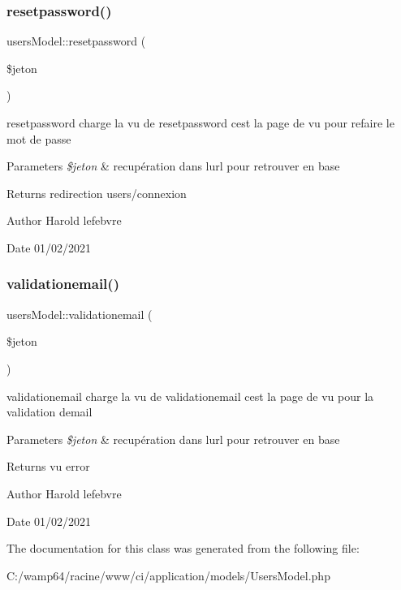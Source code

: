 \subsubsection{\texorpdfstring{resetpassword()}{resetpassword()}}
{\footnotesize\ttfamily users\+Model\+::resetpassword (\begin{DoxyParamCaption}\item[{}]{\$jeton }\end{DoxyParamCaption})}



resetpassword charge la vu de resetpassword c\textquotesingle{}est la page de vu pour refaire le mot de passe 


\begin{DoxyParams}{Parameters}
{\em \$jeton} & recupération dans l\textquotesingle{}url pour retrouver en base \\
\hline
\end{DoxyParams}
\begin{DoxyReturn}{Returns}
redirection users/connexion 
\end{DoxyReturn}
\begin{DoxyAuthor}{Author}
Harold lefebvre 
\end{DoxyAuthor}
\begin{DoxyDate}{Date}
01/02/2021 
\end{DoxyDate}
\mbox{\label{classusers_model_a7dda6a2746d9f7bb2256f1b01d0276e8}} 
\subsubsection{\texorpdfstring{validationemail()}{validationemail()}}
{\footnotesize\ttfamily users\+Model\+::validationemail (\begin{DoxyParamCaption}\item[{}]{\$jeton }\end{DoxyParamCaption})}



validationemail charge la vu de validationemail c\textquotesingle{}est la page de vu pour la validation d\textquotesingle{}email 


\begin{DoxyParams}{Parameters}
{\em \$jeton} & recupération dans l\textquotesingle{}url pour retrouver en base \\
\hline
\end{DoxyParams}
\begin{DoxyReturn}{Returns}
vu error 
\end{DoxyReturn}
\begin{DoxyAuthor}{Author}
Harold lefebvre 
\end{DoxyAuthor}
\begin{DoxyDate}{Date}
01/02/2021 
\end{DoxyDate}


The documentation for this class was generated from the following file\+:\begin{DoxyCompactItemize}
\item 
C\+:/wamp64/racine/www/ci/application/models/Users\+Model.\+php\end{DoxyCompactItemize}
